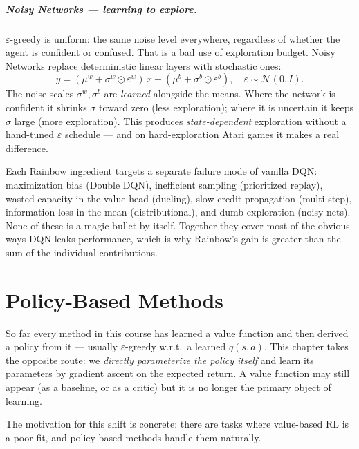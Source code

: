 \documentclass[11pt, oneside]{book}
\newcommand{\Normal}{\mathcal{N}}
\begin{document}
\paragraph{Noisy Networks --- learning to explore.}
$\varepsilon$-greedy is uniform: the same noise level everywhere, regardless of
whether the agent is confident or confused. That is a bad use of exploration budget.
Noisy Networks replace deterministic linear layers with stochastic ones:
\[
  y = (\mu^w + \sigma^w \odot \varepsilon^w)\, x + (\mu^b + \sigma^b \odot \varepsilon^b),
  \quad \varepsilon \sim \Normal(0, I).
\]
The noise scales $\sigma^w, \sigma^b$ are \emph{learned} alongside the means. Where
the network is confident it shrinks $\sigma$ toward zero (less exploration); where it
is uncertain it keeps $\sigma$ large (more exploration).
This produces \emph{state-dependent} exploration without a hand-tuned $\varepsilon$
schedule --- and on hard-exploration Atari games it makes a real difference.

\begin{intbox}[title={Why six fixes, not one?}]
Each Rainbow ingredient targets a separate failure mode of vanilla DQN: maximization
bias (Double DQN), inefficient sampling (prioritized replay), wasted capacity in the
value head (dueling), slow credit propagation (multi-step), information loss in the
mean (distributional), and dumb exploration (noisy nets).
None of these is a magic bullet by itself. Together they cover most of the obvious
ways DQN leaks performance, which is why Rainbow's gain is greater than the sum of
the individual contributions.
\end{intbox}


\chapter{Policy-Based Methods}

So far every method in this course has learned a value function and then derived a
policy from it --- usually $\varepsilon$-greedy w.r.t.\ a learned $q(s,a)$.
This chapter takes the opposite route: we \emph{directly parameterize the policy
itself} and learn its parameters by gradient ascent on the expected return.
A value function may still appear (as a baseline, or as a critic) but it is no
longer the primary object of learning.

The motivation for this shift is concrete: there are tasks where value-based RL is a
poor fit, and policy-based methods handle them naturally.
\end{document}
